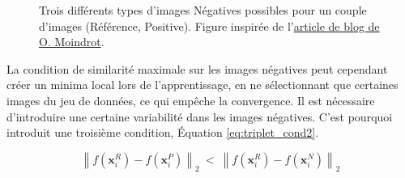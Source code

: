 \begin{figure}[hbtp]
    \centering

    \caption{Trois différents types d'images Négatives possibles pour un couple d'images (Référence, Positive). Figure inspirée de l'\href{https://omoindrot.github.io/triplet-loss}{article de blog de O. Moindrot}.}
    \label{fig:triplet_neg}
\end{figure}

La condition de similarité maximale sur les images négatives peut cependant créer un minima local lors de l'apprentissage, en ne sélectionnant que certaines images du jeu de données, ce qui empêche  la convergence.
Il est nécessaire d'introduire une certaine variabilité dans les images négatives.
C'est pourquoi \cite{schroff_facenet_2015} introduit une troisième condition, Équation \ref{eq:triplet_cond2}.

\begin{equation} \label{eq:triplet_cond2}
\left\|f\left(\mathbf{x}_{i}^{R}\right)-f\left(\mathbf{x}_{i}^{P}\right)\right\|_{2} \ < \ \left\|f\left(\mathbf{x}_{i}^{R}\right)-f\left(\mathbf{x}_{i}^{N}\right)\right\|_{2}
\end{equation}

